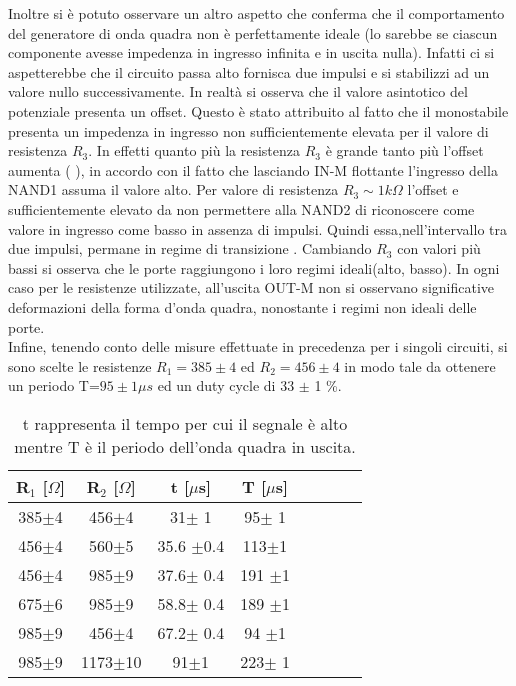  Inoltre si è potuto osservare un altro aspetto che conferma che il comportamento del generatore di onda quadra non è perfettamente ideale (lo sarebbe se ciascun componente avesse impedenza in ingresso infinita e in uscita nulla). Infatti ci si aspetterebbe che il circuito passa alto fornisca due impulsi e si stabilizzi ad un valore nullo successivamente. In realtà si osserva che il valore asintotico del potenziale presenta un offset. Questo è stato attribuito al fatto che il monostabile presenta un impedenza in ingresso non sufficientemente elevata per il valore di resistenza $R_{3}$. In effetti quanto più la resistenza $R_{3}$ è grande tanto più l'offset aumenta ( ), in accordo con il fatto che lasciando IN-M flottante l'ingresso della NAND1 assuma il valore alto. Per valore di resistenza $R_{3} \sim 1 k\Omega$ l'offset e sufficientemente elevato da non permettere alla NAND2 di riconoscere come valore in ingresso come basso in assenza di impulsi. Quindi essa,nell'intervallo tra due impulsi, permane in regime di transizione . Cambiando $R_{3}$ con valori più bassi si osserva che le porte raggiungono i loro regimi ideali(alto, basso). In ogni caso per le resistenze utilizzate, all'uscita OUT-M non si osservano significative deformazioni della forma d'onda quadra, nonostante i regimi non ideali delle porte.\\
 Infine, tenendo conto delle misure effettuate in precedenza per i singoli circuiti, si sono scelte le resistenze $R_{1}=385 \pm 4$ ed $R_{2}=456 \pm 4$ in modo tale da ottenere un periodo T=$95 \pm 1 \mu s$ ed un duty cycle di 33 $\pm$ 1 \%.
 
\begin{table}[h]
	\centering
	\begin{tabular}{cccccccc }
		{R$_1$ [$\Omega$]} & {R$_2$ [$\Omega$]} & {t [$\mu $s]} & {T [$\mu $s]}\\
		\midrule
           385$\pm$4 & 456$\pm$4 & 31$\pm$ 1 & 95$\pm$ 1\\
           456$\pm$4 & 560$\pm$5 & 35.6 $\pm$0.4 & 113$\pm$1\\
           456$\pm$4 & 985$\pm$9 & 37.6$\pm$ 0.4 & 191 $\pm$1\\
           675$\pm$6 & 985$\pm$9 & 58.8$\pm$ 0.4 & 189 $\pm$1 \\
           985$\pm$9 & 456$\pm$4 & 67.2$\pm$ 0.4 & 94 $\pm$1\\
           985$\pm$9 & 1173$\pm$10 & 91$\pm$1 & 223$\pm$ 1\\
 	\end{tabular}
	\caption{t rappresenta il tempo per cui il segnale è alto mentre T è il periodo dell'onda quadra in uscita. }
	\label{t:onde_quadre}
\end{table} 


